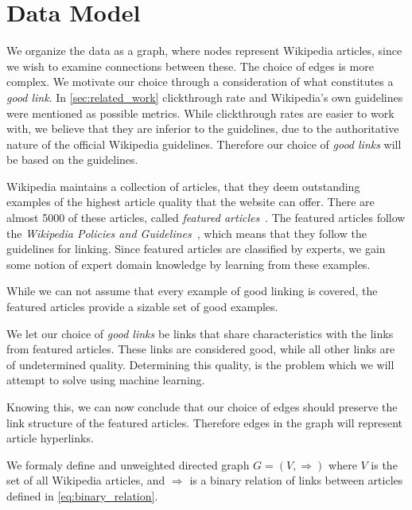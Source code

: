 \section{Data Model}\label{sec:choice_of_graph}
We organize the data as a graph, where nodes represent Wikipedia articles, since we wish to examine connections between these. The choice of edges is more complex. We motivate our choice through a consideration of what constitutes a \emph{good link}. In \cref{sec:related_work} clickthrough rate and Wikipedia's own guidelines were mentioned as possible metrics. While clickthrough rates are easier to work with, we believe that they are inferior to the guidelines, due to the authoritative nature of the official Wikipedia guidelines. Therefore our choice of \emph{good links} will be based on the guidelines.

Wikipedia maintains a collection of articles, that they deem outstanding examples of the highest article quality that the website can offer. There are almost 5000 of these articles, called \emph{featured articles}~\cite{wiki-featured-articles}. The featured articles follow the \emph{Wikipedia Policies and Guidelines}~\cite{wiki-editor-guidelines}, which means that they follow the guidelines for linking. Since featured articles are classified by experts, we gain some notion of expert domain knowledge by learning from these examples.

While we can not assume that every example of good linking is covered, the featured articles provide a sizable set of good examples. 

We let our choice of \emph{good links} be links that share characteristics with the links from featured articles. These links are considered good, while all other links are of undetermined quality. Determining this quality, is the problem which we will attempt to solve using machine learning. 

Knowing this, we can now conclude that our choice of edges should preserve the link structure of the featured articles. Therefore edges in the graph will represent article hyperlinks. 

We formaly define and unweighted directed graph $G = (V,\Rightarrow)$ where $V$ is the set of all Wikipedia articles, and $\Rightarrow$ is a binary relation of links between articles defined in \cref{eq:binary_relation}.


